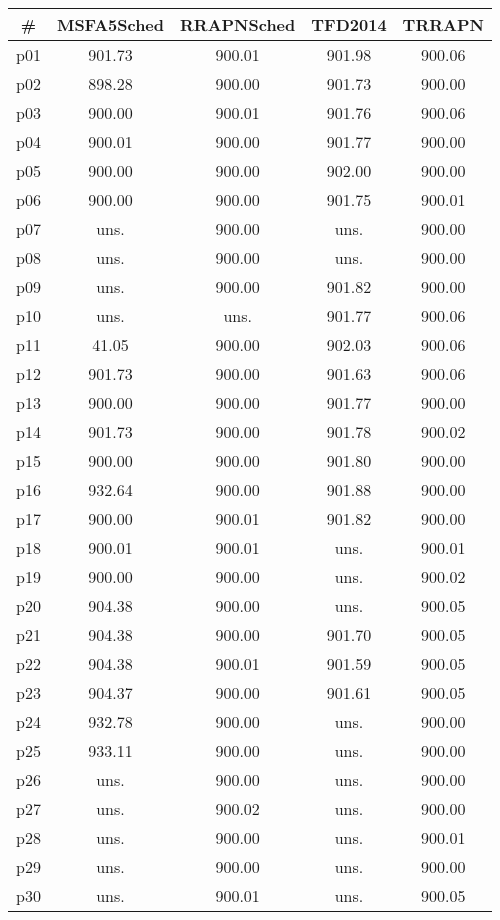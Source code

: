 \begin{tabular}{c||c|c|c|c}
\textbf{\#} & \textbf{MSFA5Sched} & \textbf{RRAPNSched} & \textbf{TFD2014} & \textbf{TRRAPN}\\
\hline
\hline
p01 & 901.73 & 900.01 & 901.98 & 900.06\\
p02 & 898.28 & 900.00 & 901.73 & 900.00\\
p03 & 900.00 & 900.01 & 901.76 & 900.06\\
p04 & 900.01 & 900.00 & 901.77 & 900.00\\
p05 & 900.00 & 900.00 & 902.00 & 900.00\\
p06 & 900.00 & 900.00 & 901.75 & 900.01\\
p07 & uns. & 900.00 & uns. & 900.00\\
p08 & uns. & 900.00 & uns. & 900.00\\
p09 & uns. & 900.00 & 901.82 & 900.00\\
p10 & uns. & uns. & 901.77 & 900.06\\
p11 & 41.05 & 900.00 & 902.03 & 900.06\\
p12 & 901.73 & 900.00 & 901.63 & 900.06\\
p13 & 900.00 & 900.00 & 901.77 & 900.00\\
p14 & 901.73 & 900.00 & 901.78 & 900.02\\
p15 & 900.00 & 900.00 & 901.80 & 900.00\\
p16 & 932.64 & 900.00 & 901.88 & 900.00\\
p17 & 900.00 & 900.01 & 901.82 & 900.00\\
p18 & 900.01 & 900.01 & uns. & 900.01\\
p19 & 900.00 & 900.00 & uns. & 900.02\\
p20 & 904.38 & 900.00 & uns. & 900.05\\
p21 & 904.38 & 900.00 & 901.70 & 900.05\\
p22 & 904.38 & 900.01 & 901.59 & 900.05\\
p23 & 904.37 & 900.00 & 901.61 & 900.05\\
p24 & 932.78 & 900.00 & uns. & 900.00\\
p25 & 933.11 & 900.00 & uns. & 900.00\\
p26 & uns. & 900.00 & uns. & 900.00\\
p27 & uns. & 900.02 & uns. & 900.00\\
p28 & uns. & 900.00 & uns. & 900.01\\
p29 & uns. & 900.00 & uns. & 900.00\\
p30 & uns. & 900.01 & uns. & 900.05\\
\end{tabular}

